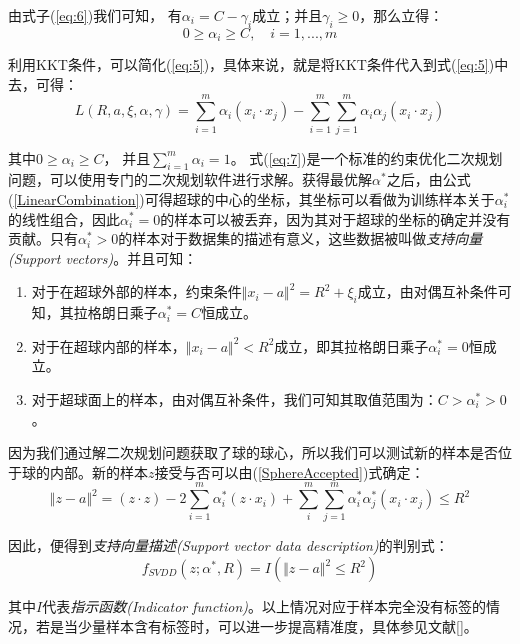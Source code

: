 \documentclass[UTF8, 12pt]{ctexart}
\begin{document}
由式子(\ref{eq:6})我们可知， 有$\alpha_{i} = C - \gamma_{i}$成立；并且$\gamma_{i} \geq 0$，那么立得：
\begin{equation}
	0 \geq \alpha_{i} \geq C, \quad i = 1,...,m
\end{equation}

利用KKT条件，可以简化(\ref{eq:5})，具体来说，就是将KKT条件代入到式(\ref{eq:5})中去，可得：
\begin{equation}
	\label{eq:7}
	L(R,a,\xi,\alpha,\gamma) = \sum_{i=1}^{m}\alpha_{i}(x_{i}·x_{j}) - \sum_{i=1}^{m}\sum_{j=1}^{m}\alpha_{i}\alpha_{j}(x_{i}·x_{j})
\end{equation}

其中$0 \geq \alpha_{i} \geq C$， 并且$\sum_{i=1}^{m} \alpha_{i} = 1$。
式(\ref{eq:7})是一个标准的约束优化二次规划问题，可以使用专门的二次规划软件进行求解。获得最优解$\alpha^{*}$之后，由公式(\ref{LinearCombination})可得超球的中心的坐标，其坐标可以看做为训练样本关于$\alpha_{i}^{*}$的线性组合，因此$\alpha_{i}^{*}=0$的样本可以被丢弃，因为其对于超球的坐标的确定并没有贡献。只有$\alpha_{i}^{*}>0$的样本对于数据集的描述有意义，这些数据被叫做\emph{支持向量(Support vectors)}。并且可知：
\begin{enumerate}
	\item 对于在超球外部的样本，约束条件${\Vert x_{i} - a \Vert}^2 = R^{2}+\xi_{i}$成立，由对偶互补条件可知，其拉格朗日乘子$\alpha_{i}^{*} = C$恒成立。
	\item 对于在超球内部的样本，${\Vert x_{i} - a \Vert}^2 < R^{2}$成立，即其拉格朗日乘子$\alpha_{i}^{*} = 0$恒成立。
	\item 对于超球面上的样本，由对偶互补条件，我们可知其取值范围为：$C > \alpha_{i}^{*} >0$。
\end{enumerate}

因为我们通过解二次规划问题获取了球的球心，所以我们可以测试新的样本是否位于球的内部。新的样本$z$接受与否可以由(\ref{SphereAccepted})式确定：
\begin{equation}
	\label{SphereAccepted}
	{\Vert z-a \Vert}^{2} = (z·z) - 2\sum_{i=1}^{m}\alpha_{i}^{*}(z·x_{i}) + \sum_{i}^{m}\sum_{j=1}^{m} \alpha_{i}^{*}\alpha_{j}^{*}(x_{i}·x_{j}) \leq R^{2}
\end{equation}

因此，便得到\emph{支持向量描述(Support vector data description)}的判别式：
\begin{equation}
	f_{SVDD}(z;\alpha^{*},R) = I({\Vert z-a \Vert}^{2} \leq R^{2})
\end{equation}

其中$I$代表\emph{指示函数(Indicator function)}。以上情况对应于样本完全没有标签的情况，若是当少量样本含有标签时，可以进一步提高精准度，具体参见文献[]。
\end{document}
